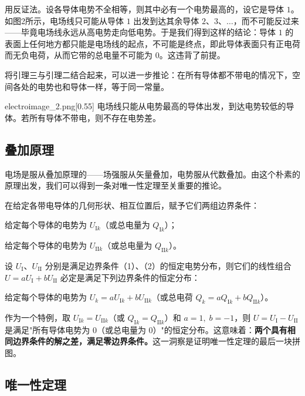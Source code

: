 用反证法。设各导体电势不全相等，则其中必有一个电势最高的，设它是导体 $1$。如图2所示，电场线只可能从导体 $1$ 出发到达其余导体 $2$、$3$、$\ldots$，而不可能反过来——毕竟电场线永远从高电势走向低电势。于是我们得到这样的结论：导体 $1$ 的表面上任何地方都只能是电场线的起点，不可能是终点，即此导体表面只有正电荷而无负电荷，从而它带的总电量不可能为 $0$。这违背了前提。

将引理三与引理二结合起来，可以进一步推论：在所有导体都不带电的情况下，空间各处的电势也和导体一样，等于同一常量。

\begin{singlefigure}{electroimage_2.png}[0.55]
    电场线只能从电势最高的导体出发，到达电势较低的导体。若所有导体不带电，则不存在电势差。
\end{singlefigure}

\subsection{叠加原理}

电场是服从叠加原理的——场强服从矢量叠加，电势服从代数叠加。由这个朴素的原理出发，我们可以得到一条对唯一性定理至关重要的推论。

在给定各带电导体的几何形状、相互位置后，赋予它们两组边界条件：
\begin{Itemize}
    \item 给定每个导体的电势为 $U_{\text{I}k}$（或总电量为 $Q_{\text{I}k}$）；
    \item 给定每个导体的电势为 $U_{\text{II}k}$（或总电量为 $Q_{\text{II}k}$）。
\end{Itemize}
设 $U_{\text{I}}$、$U_{\text{II}}$ 分别是满足边界条件（1）、（2）的恒定电势分布，则它们的线性组合 $U = aU_{\text{I}} + bU_{\text{II}}$ 必定是满足下列边界条件的恒定分布：
\begin{Itemize}
    \item 给定每个导体的电势为 $U_k = aU_{\text{I}k} + bU_{\text{II}k}$（或总电荷 $Q_k = aQ_{\text{I}k} + bQ_{\text{II}k}$）。
\end{Itemize}

作为一个特例，取 $U_{\text{I}k} = U_{\text{II}k}$（或 $Q_{\text{I}k} = Q_{\text{II}k}$）和 $a=1,\; b=-1$，则 $U = U_{\text{I}} - U_{\text{II}}$ 是满足"所有导体电势为 $0$（或总电量为 $0$）"的恒定分布。这意味着：\textbf{两个具有相同边界条件的解之差，满足零边界条件。}这一洞察是证明唯一性定理的最后一块拼图。

\subsection{唯一性定理}

